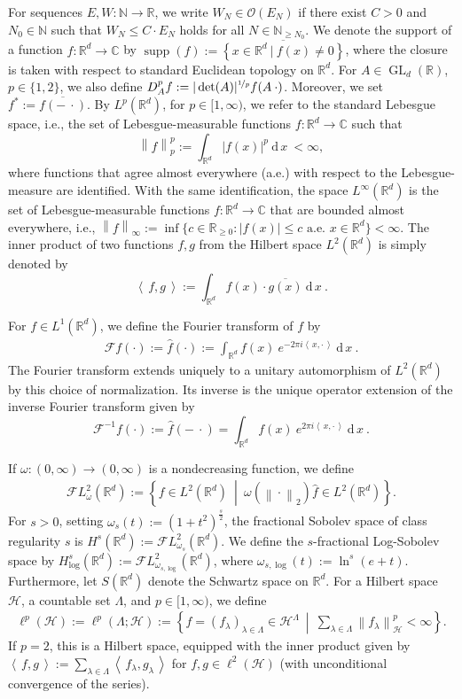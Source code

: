 \documentclass[11pt]{amsart}
\newcommand{\R}{{\mathbb{R}}}
\newcommand{\C}{{\mathbb{C}}}
\newcommand{\N}{\mathbb{N}}
\newcommand{\h}{\mathcal{H}}
\newcommand{\dx}{\:\mathrm{d}\,x\:}
\newcommand{\norm}[1]{\ensuremath{\left\lVert\text{}#1\text{}\right\rVert}}
\newcommand{\ip}[1]{\ensuremath{\left<\text{} \, #1 \, \text{}\right>}}
\newcommand{\set}[1]{\ensuremath{\left\{\text{}#1\text{}\right\}}}
\DeclareMathOperator{\GL}{GL}
\DeclareMathOperator{\supp}{supp}
\newenvironment{proof sketch} {\textit{Proof sketch.}}{}
\begin{document}
  For sequences $E,W: \N \to \R$, we write $W_N \in \mathcal{O}(E_N)$ if there exist $C>0$ and $N_0 \in \N$ such that $W_N \leq C \cdot E_N$ holds for all $N \in \N_{\geq N_0}$. We denote the support of a function $f: \R^d \to \C$ by $\supp(f):=\overline{\set{x \in \R^d ~|~ f(x)\neq 0}}$, where the closure is taken with respect to standard Euclidean topology on $\R^d$. For $A\in\GL_d(\R)$, $p \in \{1,2\}$, we also define $D_A^pf:=|\det(A)|^{\nicefrac{1}{p}} f(A \:\cdot)$. 
  Moreover, we set $f^*:=\overline{f(-\:\cdot)}$. By $L^p(\R^d)$, for $p\in [1,\infty)$, we refer to the standard Lebesgue space, i.e., the set of Lebesgue-measurable functions $f:\R^d \to \C$ such that \[\norm{f}_p^p:=\int_{\R^d} |f(x)|^p \dx<\infty,\] where functions that agree almost everywhere (a.e.) with respect to the Lebesgue-measure are identified. With the same identification, the space $L^\infty(\R^d)$ is the set of Lebesgue-measurable functions $f:\R^d \to \C$ that are bounded almost everywhere, i.e., $\norm{f}_\infty:=\inf\{c\in \R_{\geq 0}: |f(x)| \leq c \text{ a.e. } x \in \R^d\}<\infty$. The inner product of two functions $f,g$ from the Hilbert space $L^2(\R^d)$ is simply denoted by \[\ip{f,g}:=\int_{\R^d} f(x)\cdot \overline{g(x)} \dx.\]
  
  For $f \in L^1(\R^d)$, we define the Fourier transform of $f$ by
  \begin{align}\label{def: Fourier transform}
    \mathcal{F}f(\cdot):=\widehat{f}(\cdot):=\int_{\R^d} f(x) ~ e^{-2\pi i \ip{x, \cdot}} \dx.
  \end{align}
  The Fourier transform extends uniquely to a unitary automorphism of $L^2(\R^d)$ by this choice of normalization.
  Its inverse is the unique operator extension of the inverse Fourier transform given by 
  \[\mathcal{F}^{-1}f(\cdot):=\widehat{f}(-\:\cdot)=\int_{\R^d} f(x) ~ e^{2\pi i \ip{x, \cdot}} \dx.\]
  
  If $\omega:(0,\infty)\to (0,\infty)$ is a nondecreasing function, we define
  \begin{align}\label{def: weighted Sobolev space}
  \mathcal{F}L_\omega^2(\R^d):=\set{f \in L^2(\R^d)~\middle|~  \omega(\norm{\cdot}_2) \widehat{f} \in L^2(\R^d)}.
  \end{align}
  For $s>0$, setting $\omega_s(t):=(1+t^2)^{\frac{s}{2}}$, the fractional Sobolev space of class regularity $s$ is $H^s(\R^d):=\mathcal{F}L^2_{\omega_s}(\R^d)$. We define the $s$-fractional Log-Sobolev space by $H^s_{\log}(\R^d):=\mathcal{F}L^2_{\omega_{s,\log}}(\R^d)$, where $\omega_{s,\log}(t):=\ln^s(e+t)$. Furthermore, let $S(\R^d)$ denote the Schwartz space on $\R^d$. 
  For a Hilbert space $\h$, a countable set $\Lambda$, and $p \in [1,\infty)$, we define
  \begin{align}\label{def: vector-valued sequence space}
    \ell^p(\h):=\ell^p(\Lambda;\h):=\left\{f=(f_\lambda)_{\lambda \in \Lambda} \in \h^\Lambda~\middle|~ \sum_{\lambda \in \Lambda} \norm{f_\lambda}_{\h}^p<\infty\right\}.
  \end{align}
  If $p=2$, this is a Hilbert space, equipped with the inner product given by $\ip{f,g}:=\sum_{\lambda \in \Lambda} \ip{f_\lambda,g_\lambda}$ for $f,g \in \ell^2(\h)$ (with unconditional convergence of the series).
  
\end{document}

